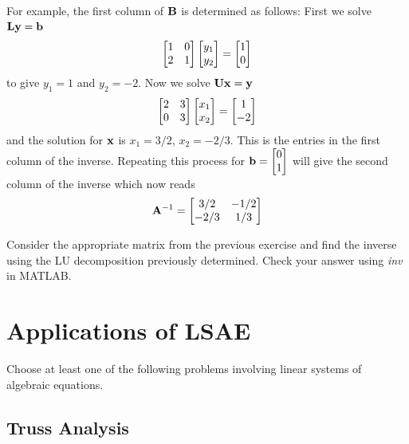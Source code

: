 For example, the first column of $\mathbf{B}$ is determined as follows: First we solve $\mathbf{L} \mathbf{y} = \mathbf{b}$
\[ \begin{bmatrix} 1 & 0 \\ 2 & 1\end{bmatrix} \begin{bmatrix} y_1 \\ y_2 \end{bmatrix} = \begin{bmatrix} 1 \\ 0 \end{bmatrix} \]
to give $y_1 = 1$ and $y_2 = -2$. Now we solve $\mathbf{U} \mathbf{x} = \mathbf{y}$
\[ \begin{bmatrix} 2 & 3 \\ 0 & 3\end{bmatrix} \begin{bmatrix} x_1 \\ x_2 \end{bmatrix} = \begin{bmatrix} 1 \\ -2 \end{bmatrix} \]
and the solution for $\mathbf{x}$ is $x_1 = 3/2$, $x_2 = -2/3$. This is the entries in the first column of the inverse. Repeating this process for $\mathbf{b} = \begin{bmatrix} 0 \\ 1 \end{bmatrix}$ will give the second column of the inverse which now reads
\[ \mathbf{A}^{-1} = \begin{bmatrix} 3/2 & -1/2 \\ -2/3 & 1/3\end{bmatrix} \]

\begin{prob}
\be
\item Consider the appropriate matrix from the previous exercise and find the inverse using the LU decomposition previously determined. Check your answer using \textit{inv} in MATLAB.
\ee
\end{prob}

\section{Applications of LSAE}

Choose at least one of the following problems involving linear systems of algebraic equations.

\subsection{Truss Analysis}

